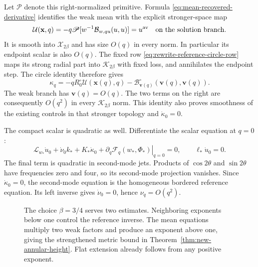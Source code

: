 Let $\mathscr P$ denote this right-normalized primitive. Formula
\eqref{eq:mean-recovered-derivative} identifies the weak mean with
the explicit stronger-space map
\begin{equation}\label{eq:rewrite-mean-recovery}
 \mathcal U(\mathbf x,q)
 =-q\mathscr P[w^{-1}\mathcal B_{w,qu}(u,u)]
 =u^{\rm av}\quad\text{on the solution branch}.
\end{equation}
It is smooth into $\mathcal X_{2\beta}$ and has size $O(q)$ in
every norm. In particular its endpoint scalar is also $O(q)$.
The fixed row \eqref{eq:rewrite-reference-circle-row} maps its
strong radial part into $\mathcal K_{2\beta}$ with fixed loss,
and annihilates the endpoint step. The circle identity therefore gives
\begin{equation}\label{eq:rewrite-control-recovery}
 \kappa_q=-qR_0^\circ\mathcal U(\mathbf x(q),q)
            -\mathcal B^\circ_{\mathbf v(q)}(\mathbf v(q),\mathbf v(q)).
\end{equation}
The weak branch has $\mathbf v(q)=O(q)$. The two terms on the right
are consequently $O(q^2)$ in every $\mathcal K_{2\beta}$ norm.
This identity also proves smoothness of the existing controls in
that stronger topology and $\dot\kappa_0=0$.

The compact scalar is quadratic as well. Differentiate the scalar
equation at $q=0$:
\[
 \mathscr L_{w_*}\dot u_0+\dot\nu_0 k_*+K_*\dot\kappa_0
       +\left.\partial_q\mathcal F_q(w_*,\Phi_*)\right|_{q=0}=0,
 \qquad \ell_*\dot u_0=0.
\]
The final term is quadratic in second-mode jets. Products of
$\cos2\theta$ and $\sin2\theta$ have frequencies zero and four,
so its second-mode projection vanishes. Since $\dot\kappa_0=0$,
the second-mode equation is the homogeneous bordered reference
equation. Its left inverse gives $\dot\nu_0=0$, hence $\nu_q=O(q^2)$.

\begin{figure}[htbp]
\centering
{}
\caption{The choice $\beta=3/4$ serves two estimates. Neighboring
exponents below one control the reference inverse. The mean equations
multiply two weak factors and produce an exponent above one, giving
the strengthened metric bound in Theorem~\ref{thm:new-annular-height}.
Flat extension already follows from any positive exponent.}
\label{fig:exponent-gain}
\end{figure}

